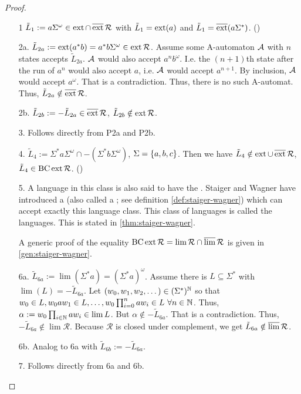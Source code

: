 \begin{lemma}
\begin{proof}
\begin{enumerate}
\item[1] $\tilde{L}_1 := a \Sigma^\omega \in \operatorname{ext} \cap \operatorname{\overline{ext}} \mathcal{R}$ with $\tilde{L}_1 = \operatorname{ext}(a)$ and $\tilde{L}_1 = \operatorname{\overline{ext}} (a \Sigma^*)$. (\cite[prop, p.38]{InfCompR101})
\item[2a.] $\tilde{L}_{2a} := \operatorname{ext}(a^* b) = a^* b \Sigma^\omega \in \operatorname{ext} \mathcal{R}$. Assume some A-automaton $\mathcal{A}$ with $n$ states accepts $\tilde{L}_{2a}$. $\mathcal{A}$ would also accept $a^n b^\omega$. I.e. the $(n+1)$th state after the run of $a^n$ would also accept $a$, i.e. $\mathcal{A}$ would accept $a^{n+1}$. By inclusion, $\mathcal{A}$ would accept $a^\omega$. That is a contradiction. Thus, there is no such A-automat. Thus, $\tilde{L}_{2a} \notin \operatorname{\overline{ext}} \mathcal{R}$.
\item[2b.] $\tilde{L}_{2b} := - \tilde{L}_{2a} \in \operatorname{\overline{ext}} \mathcal{R}$, $\tilde{L}_{2b} \notin \operatorname{ext} \mathcal{R}$.
\item[3.] Follows directly from P2a and P2b.
\item[4.] $\tilde{L}_4 := \Sigma^* a \Sigma^\omega \cap -(\Sigma^* b \Sigma^\omega)$, $\Sigma = \Set{a,b,c}$. Then we have $\tilde{L}_4 \notin \operatorname{ext} \cup \operatorname{\overline{ext}} \mathcal{R}$, $\tilde{L}_4 \in \operatorname{BC} \operatorname{ext} \mathcal{R}$. (\cite[p.38]{InfCompR101})

\item[5.]
A language in this class is also said to have the . Staiger and Wagner have introduced a  (also called a ; see definition \ref{def:staiger-wagner}) which can accept exactly this language class. This class of languages is called the  languages. This is stated in \cref{thm:staiger-wagner}.


A generic proof of the equality $\operatorname{BC} \operatorname{ext} \mathcal{R} = \lim \mathcal{R} \cap \operatorname{\overline{lim}} \mathcal{R}$ is given in \cref{gen:staiger-wagner}.

\item[6a.] $\tilde{L}_{6a} := \lim(\Sigma^* a) = (\Sigma^* a)^\omega$. Assume there is $L \subseteq \Sigma^*$ with $\lim(L) = -\tilde{L}_{6a}$. Let $(w_0,w_1,w_2,\dotsc) \in (\Sigma^*)^{\mathbb{N}}$ so that $w_0 \in L, w_0 a w_1 \in L, \dotsc, w_0 \prod_{i=0}^n a w_i \in L \ \forall n \in \mathbb{N}$. Thus, $\alpha := w_0 \prod_{i \in \mathbb{N}} a w_i \in \lim L$. But $\alpha \notin -\tilde{L}_{6a}$. That is a contradiction. Thus, $-\tilde{L}_{6a} \notin \lim \mathcal{R}$. Because $\mathcal{R}$ is closed under complement, we get $\tilde{L}_{6a} \notin \operatorname{\overline{lim}} \mathcal{R}$.
\item[6b.] Analog to 6a with $\tilde{L}_{6b} := -\tilde{L}_{6a}$.
\item[7.] Follows directly from 6a and 6b.


\end{enumerate}
\end{proof}
\end{lemma}
